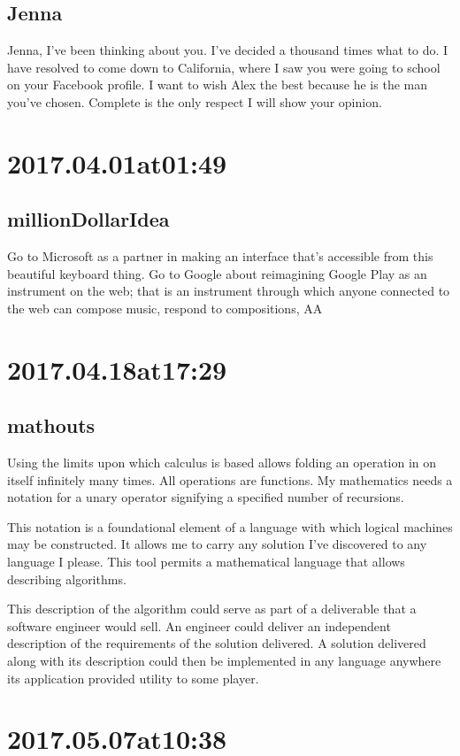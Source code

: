 \subsection*{ Jenna }
Jenna, I've been thinking about you. I've decided a thousand times what to do. I have resolved to come down to California, where I saw you were going to school on your Facebook profile. I want to wish Alex the best because he is the man you've chosen. Complete is the only respect I will show your opinion.

\section*{ 2017.04.01at01:49 }
\subsection*{ millionDollarIdea }
Go to Microsoft as a partner in making an interface that's accessible from this beautiful keyboard thing. Go to Google about reimagining Google Play as an instrument on the web; that is an instrument through which anyone connected to the web can compose music, respond to compositions, AA

\section*{ 2017.04.18at17:29 }
\subsection*{ mathouts }
Using the limits upon which calculus is based allows folding an operation in on itself infinitely many times. All operations are functions. My mathematics needs a notation for a unary operator signifying a specified number of recursions.

This notation is a foundational element of a language with which logical machines may be constructed. It allows me to carry any solution I've discovered to any language I please. This tool permits a mathematical language that allows describing algorithms.

This description of the algorithm could serve as part of a deliverable that a software engineer would sell. An engineer could deliver an independent description of the requirements of the solution delivered. A solution delivered along with its description could then be implemented in any language anywhere its application provided utility to some player.

\section*{ 2017.05.07at10:38 }
